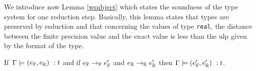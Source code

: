We introduce now Lemma \ref{wsubject} which states the soundness of the type system for one
reduction step. 
Basically, this lemma states that types are preserved by reduction and that 
concerning the values of type \texttt{real}, the distance between the finite precision value
and the exact value is less than the \textsf{ulp} given by the format of the type.


\begin{lemma}
\label{wsubject}
If\ $\Gamma \models (e_{\mathbb{F}},e_{\mathbb{R}})\ : t$ and if  $e_{\mathbb{F}}\rightarrow_{\mathbb{F}} e_{\mathbb{F}}'$ and
$e_{\mathbb{R}}\rightarrow_{\mathbb{R}} e_{\mathbb{R}}'$ then $\Gamma \models (e_{\mathbb{F}}',e_{\mathbb{R}}')\ : t$. 
\end{lemma} 

